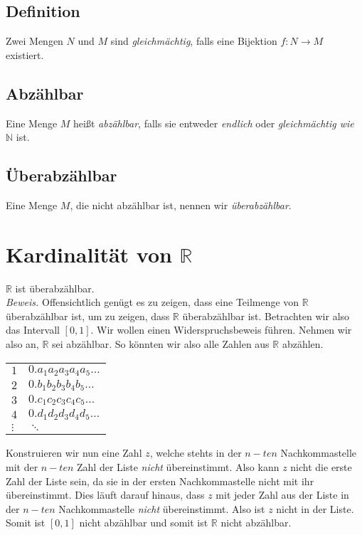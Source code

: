\documentclass{scrreprt}
\newenvironment{proof}{\emph{\\Beweis.}}{}
\newcommand{\NN}{\mathbb{N}}
\newcommand{\RR}{\mathbb{R}}
\begin{document}
		\subsection{Definition}
		Zwei Mengen $N$ und $M$ sind \emph{gleichmächtig}, falls eine Bijektion $f: N \longrightarrow M$ existiert.
		\subsection{Abzählbar}
		Eine Menge $M$ heißt \emph{abzählbar}, falls sie entweder \emph{endlich} oder \emph{gleichmächtig wie $\NN$} ist.
		\subsection{Überabzählbar}
		Eine Menge $M$, die nicht abzählbar ist, nennen wir \emph{überabzählbar}.

	\section{Kardinalität von $\RR$}
	$\RR$ ist überabzählbar.
	\begin{proof}
		Offensichtlich genügt es zu zeigen, dass eine Teilmenge von $\RR$ überabzählbar ist, um zu zeigen, dass $\RR$ überabzählbar ist. Betrachten wir also das Intervall $[0,1]$. Wir wollen einen Widerspruchsbeweis führen. Nehmen wir also an, $\RR$ sei abzählbar. So könnten wir also alle Zahlen aus $\RR$ abzählen.\\
		\begin{center}
			\begin{tabular}{ll}
				$1$ & $0.a_1 a_2 a_3 a_4 a_5 \dots$\\
				$2$ & $0.b_1 b_2 b_3 b_4 b_5 \dots$\\
				$3$ & $0.c_1 c_2 c_3 c_4 c_5 \dots$\\
				$4$ & $0.d_1 d_2 d_3 d_4 d_5 \dots$\\
				$\vdots$ & $\ddots$  
			\end{tabular}
		\end{center}
		Konstruieren wir nun eine Zahl $z$, welche stehts in der $n-ten$ Nachkommastelle mit der $n-ten$ Zahl der Liste \emph{nicht} übereinstimmt. Also kann $z$ nicht die erste Zahl der Liste sein, da sie in der ersten Nachkommastelle nicht mit ihr übereinstimmt. Dies läuft darauf hinaus, dass $z$ mit jeder Zahl aus der Liste in der $n-ten$ Nachkommastelle \emph{nicht} übereinstimmt. Also ist $z$ nicht in der Liste. Somit ist $[0,1]$ nicht abzählbar und somit ist $\RR$ nicht abzählbar.
	\end{proof}
	
\end{document}
